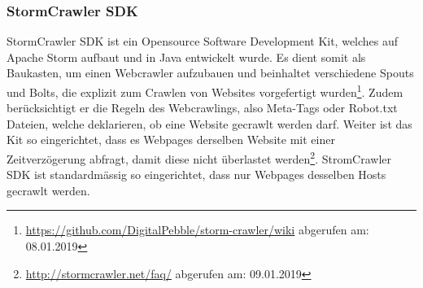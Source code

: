 \subsubsection{StormCrawler SDK}
StormCrawler SDK ist ein Opensource Software Development Kit, welches auf Apache Storm aufbaut und in Java entwickelt wurde.
Es dient somit als Baukasten, um einen Webcrawler aufzubauen und beinhaltet verschiedene Spouts und Bolts, die explizit zum Crawlen von Websites vorgefertigt wurden\footnote{\url{https://github.com/DigitalPebble/storm-crawler/wiki} abgerufen am: 08.01.2019}.
Zudem berücksichtigt er die Regeln des Webcrawlings, also Meta-Tags oder Robot.txt Dateien, welche deklarieren, ob eine Website gecrawlt werden darf.
Weiter ist das Kit so eingerichtet, dass es Webpages derselben Website mit einer Zeitverzögerung abfragt, damit diese nicht überlastet werden\footnote{\url{http://stormcrawler.net/faq/} abgerufen am: 09.01.2019}.
StromCrawler SDK ist standardmässig so eingerichtet, dass nur Webpages desselben Hosts gecrawlt werden.
